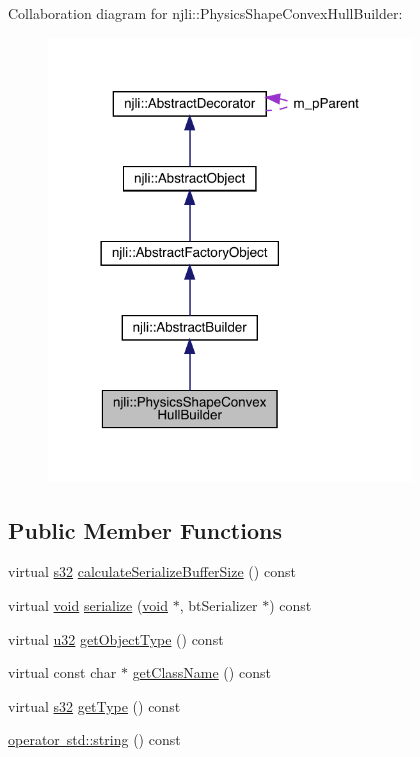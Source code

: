 Collaboration diagram for njli\+:\+:Physics\+Shape\+Convex\+Hull\+Builder\+:\nopagebreak
\begin{figure}[H]
\begin{center}
\leavevmode
\includegraphics[width=273pt]{classnjli_1_1_physics_shape_convex_hull_builder__coll__graph}
\end{center}
\end{figure}
\subsection*{Public Member Functions}
\begin{DoxyCompactItemize}
\item 
virtual \mbox{\hyperlink{_util_8h_aa62c75d314a0d1f37f79c4b73b2292e2}{s32}} \mbox{\hyperlink{classnjli_1_1_physics_shape_convex_hull_builder_a96ace17c99a343b123555173e1150316}{calculate\+Serialize\+Buffer\+Size}} () const
\item 
virtual \mbox{\hyperlink{_thread_8h_af1e856da2e658414cb2456cb6f7ebc66}{void}} \mbox{\hyperlink{classnjli_1_1_physics_shape_convex_hull_builder_a10dc63611b53d78494287ecca38fe3dc}{serialize}} (\mbox{\hyperlink{_thread_8h_af1e856da2e658414cb2456cb6f7ebc66}{void}} $\ast$, bt\+Serializer $\ast$) const
\item 
virtual \mbox{\hyperlink{_util_8h_a10e94b422ef0c20dcdec20d31a1f5049}{u32}} \mbox{\hyperlink{classnjli_1_1_physics_shape_convex_hull_builder_a76d05fadd8ccea50dd90a6528e5002c9}{get\+Object\+Type}} () const
\item 
virtual const char $\ast$ \mbox{\hyperlink{classnjli_1_1_physics_shape_convex_hull_builder_af7f60ae74a27d8338281678cd150160f}{get\+Class\+Name}} () const
\item 
virtual \mbox{\hyperlink{_util_8h_aa62c75d314a0d1f37f79c4b73b2292e2}{s32}} \mbox{\hyperlink{classnjli_1_1_physics_shape_convex_hull_builder_a844516ec483973fc1d0264c7c4c3f79b}{get\+Type}} () const
\item 
\mbox{\hyperlink{classnjli_1_1_physics_shape_convex_hull_builder_a8c2b997c0e957a8c011c2972011d1b79}{operator std\+::string}} () const
\end{DoxyCompactItemize}
